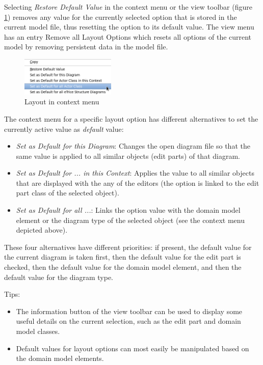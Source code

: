 Selecting \textit{Restore Default Value} in the context menu or the view toolbar (figure \ref{fig:layout_context_menu})
removes any value for the 
currently selected option that is stored in the current model file, thus resetting the option to its 
default value. The view menu has an entry Remove all Layout Options which resets all options of the 
current model by removing persistent data in the model file.

\begin{figure}
\includegraphics[width=0.4\textwidth]{images/043-ContextMenu.png}
\caption{Layout in context menu}
\label{fig:layout_context_menu}
\end{figure}

The context menu for a specific layout option has different alternatives to set the currently active value 
as \emph{default} value:

\begin{itemize}
\item \emph{Set as Default for this Diagram}: Changes the open diagram file so that the same value is 
applied to all similar objects (edit parts) of that diagram.

\item \emph{Set as Default for ... in this Context}: Applies the value to all similar objects that are 
displayed with the any of the \eTrice{} editors (the option is linked to the edit part class of the selected 
object).

\item \emph{Set as Default for all ...}: Links the option value with the domain model element or the 
diagram type of the selected object (see the context menu depicted above).
\end{itemize}

These four alternatives have different priorities: if present, the default value for the current diagram 
is taken first, then the default value for the edit part is checked, then the default value for the domain 
model element, and then the default value for the diagram type.

Tips:
\begin{itemize}
\item The information button of the view toolbar can be used to display some useful details on the current 
selection, such as the edit part and domain model classes.
\item Default values for layout options can most easily be manipulated based on the \eTrice{} domain model 
elements.
\end{itemize}

